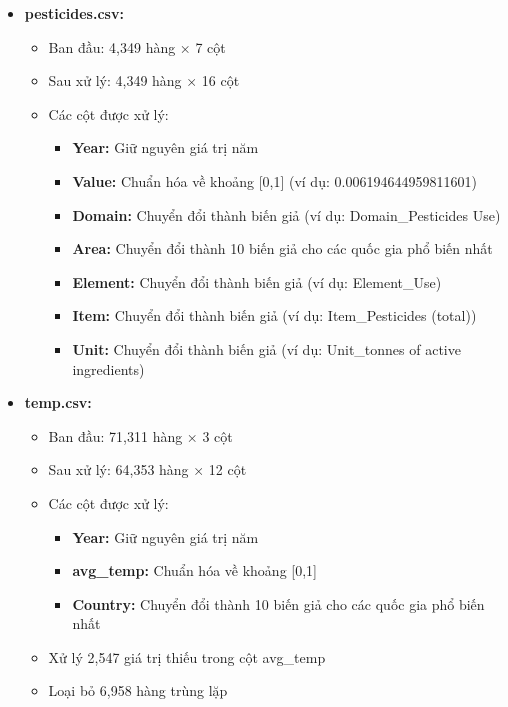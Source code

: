 \begin{itemize}
    \item \textbf{pesticides.csv:}
    \begin{itemize}
        \item Ban đầu: 4,349 hàng × 7 cột
        \item Sau xử lý: 4,349 hàng × 16 cột
        \item Các cột được xử lý:
        \begin{itemize}
            \item \textbf{Year:} Giữ nguyên giá trị năm
            \item \textbf{Value:} Chuẩn hóa về khoảng [0,1] (ví dụ: 0.006194644959811601)
            \item \textbf{Domain:} Chuyển đổi thành biến giả (ví dụ: Domain\_Pesticides Use)
            \item \textbf{Area:} Chuyển đổi thành 10 biến giả cho các quốc gia phổ biến nhất
            \item \textbf{Element:} Chuyển đổi thành biến giả (ví dụ: Element\_Use)
            \item \textbf{Item:} Chuyển đổi thành biến giả (ví dụ: Item\_Pesticides (total))
            \item \textbf{Unit:} Chuyển đổi thành biến giả (ví dụ: Unit\_tonnes of active ingredients)
        \end{itemize}
    \end{itemize}
    
    \item \textbf{temp.csv:}
    \begin{itemize}
        \item Ban đầu: 71,311 hàng × 3 cột
        \item Sau xử lý: 64,353 hàng × 12 cột
        \item Các cột được xử lý:
        \begin{itemize}
            \item \textbf{Year:} Giữ nguyên giá trị năm
            \item \textbf{avg\_temp:} Chuẩn hóa về khoảng [0,1]
            \item \textbf{Country:} Chuyển đổi thành 10 biến giả cho các quốc gia phổ biến nhất
        \end{itemize}
        \item Xử lý 2,547 giá trị thiếu trong cột avg\_temp
        \item Loại bỏ 6,958 hàng trùng lặp
    \end{itemize}
    

\end{itemize}

